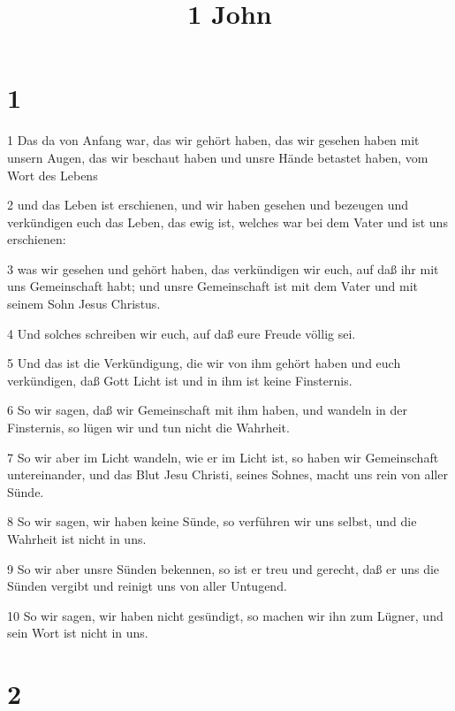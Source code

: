 

\title{1 John}


\chapter{1}

\par 1 Das da von Anfang war, das wir gehört haben, das wir gesehen haben mit unsern Augen, das wir beschaut haben und unsre Hände betastet haben, vom Wort des Lebens
\par 2 und das Leben ist erschienen, und wir haben gesehen und bezeugen und verkündigen euch das Leben, das ewig ist, welches war bei dem Vater und ist uns erschienen:
\par 3 was wir gesehen und gehört haben, das verkündigen wir euch, auf daß ihr mit uns Gemeinschaft habt; und unsre Gemeinschaft ist mit dem Vater und mit seinem Sohn Jesus Christus.
\par 4 Und solches schreiben wir euch, auf daß eure Freude völlig sei.
\par 5 Und das ist die Verkündigung, die wir von ihm gehört haben und euch verkündigen, daß Gott Licht ist und in ihm ist keine Finsternis.
\par 6 So wir sagen, daß wir Gemeinschaft mit ihm haben, und wandeln in der Finsternis, so lügen wir und tun nicht die Wahrheit.
\par 7 So wir aber im Licht wandeln, wie er im Licht ist, so haben wir Gemeinschaft untereinander, und das Blut Jesu Christi, seines Sohnes, macht uns rein von aller Sünde.
\par 8 So wir sagen, wir haben keine Sünde, so verführen wir uns selbst, und die Wahrheit ist nicht in uns.
\par 9 So wir aber unsre Sünden bekennen, so ist er treu und gerecht, daß er uns die Sünden vergibt und reinigt uns von aller Untugend.
\par 10 So wir sagen, wir haben nicht gesündigt, so machen wir ihn zum Lügner, und sein Wort ist nicht in uns.

\chapter{2}

